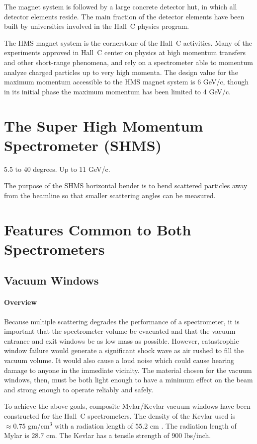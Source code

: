 The magnet system is followed by a large concrete detector hut, in which all
detector elements reside. The main fraction of the detector elements have been
built by universities involved in the Hall~C physics program.

The HMS magnet system is the cornerstone of the Hall~C activities.
Many of the experiments approved in Hall~C center on physics at high
momentum transfers and other short-range phenomena, and rely on a spectrometer
able to momentum analyze charged particles up to very high momenta.
The design value for the maximum momentum accessible to the HMS magnet
system is 6 GeV/c, though in its initial phase the maximum momentum
has been limited to 4 GeV/c.

\section{The Super High Momentum Spectrometer (SHMS)}
5.5 to 40 degrees.  Up to 11 GeV/c.  

The purpose of the SHMS horizontal bender is to bend scattered
particles away from the beamline so that smaller scattering angles can be
measured.
\section{Features Common to Both Spectrometers}

\subsection{Vacuum Windows}

\paragraph{Overview}

Because multiple scattering degrades the performance of a spectrometer, it is
important that the spectrometer volume be evacuated and that the vacuum
entrance and exit windows
be as low mass as possible. However,
catastrophic window failure would generate a significant shock wave as air
rushed to fill the vacuum volume. It would also cause a loud noise which
could cause hearing damage to anyone in the immediate vicinity.
The material chosen for the vacuum windows, then, must be both light enough
to have a minimum effect on the beam and
strong enough to operate reliably and safely.

To achieve the above goals,
composite Mylar/Kevlar vacuum windows have been constructed for the
Hall~C spectrometers. The density of the Kevlar used
is $\approx 0.75$ gm/cm$^3$ with a radiation
length of $55.2$ cm \cite{rdup1}. The radiation length
of Mylar is $28.7$ cm. The Kevlar has a tensile strength of 900 lbs/inch.

